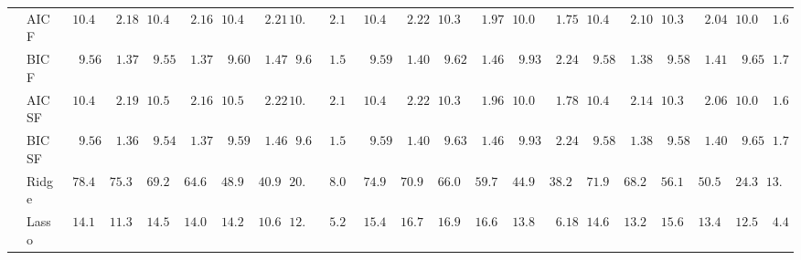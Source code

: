 \begin{tabular}{ll|ll|llllll|llllll|llllll}
 & AIC F  & $\phantom{0}10.48$ & $\phantom{00}2.18$ & $\phantom{0}10.49$ & $\phantom{00}2.16$ & $\phantom{0}10.49$ & $\phantom{00}2.21$ & $10.48$ & $\phantom{0}2.17$ & $\phantom{0}10.47$ & $\phantom{00}2.22$ & $\phantom{0}10.34$ & $\phantom{00}1.97$ & $\phantom{0}10.03$ & $\phantom{00}1.75$ & $\phantom{0}10.44$ & $\phantom{00}2.10$ & $\phantom{0}10.37$ & $\phantom{00}2.04$ & $\phantom{0}10.00$ & $\phantom{0}1.66$ \\
 & BIC F  & $\phantom{00}9.56$ & $\phantom{00}1.37$ & $\phantom{00}9.55$ & $\phantom{00}1.37$ & $\phantom{00}9.60$ & $\phantom{00}1.47$ & $\phantom{0}9.66$ & $\phantom{0}1.54$ & $\phantom{00}9.59$ & $\phantom{00}1.40$ & $\phantom{00}9.62$ & $\phantom{00}1.46$ & $\phantom{00}9.93$ & $\phantom{00}2.24$ & $\phantom{00}9.58$ & $\phantom{00}1.38$ & $\phantom{00}9.58$ & $\phantom{00}1.41$ & $\phantom{00}9.65$ & $\phantom{0}1.71$ \\
 & AIC SF  & $\phantom{0}10.49$ & $\phantom{00}2.19$ & $\phantom{0}10.50$ & $\phantom{00}2.16$ & $\phantom{0}10.50$ & $\phantom{00}2.22$ & $10.49$ & $\phantom{0}2.18$ & $\phantom{0}10.48$ & $\phantom{00}2.22$ & $\phantom{0}10.34$ & $\phantom{00}1.96$ & $\phantom{0}10.03$ & $\phantom{00}1.78$ & $\phantom{0}10.45$ & $\phantom{00}2.14$ & $\phantom{0}10.39$ & $\phantom{00}2.06$ & $\phantom{0}10.00$ & $\phantom{0}1.65$ \\
 & BIC SF  & $\phantom{00}9.56$ & $\phantom{00}1.36$ & $\phantom{00}9.54$ & $\phantom{00}1.37$ & $\phantom{00}9.59$ & $\phantom{00}1.46$ & $\phantom{0}9.66$ & $\phantom{0}1.54$ & $\phantom{00}9.59$ & $\phantom{00}1.40$ & $\phantom{00}9.63$ & $\phantom{00}1.46$ & $\phantom{00}9.93$ & $\phantom{00}2.24$ & $\phantom{00}9.58$ & $\phantom{00}1.38$ & $\phantom{00}9.58$ & $\phantom{00}1.40$ & $\phantom{00}9.65$ & $\phantom{0}1.71$ \\
 & Ridge  & $\phantom{0}78.43$ & $\phantom{0}75.30$ & $\phantom{0}69.23$ & $\phantom{0}64.62$ & $\phantom{0}48.98$ & $\phantom{0}40.90$ & $20.64$ & $\phantom{0}8.04$ & $\phantom{0}74.98$ & $\phantom{0}70.95$ & $\phantom{0}66.05$ & $\phantom{0}59.78$ & $\phantom{0}44.97$ & $\phantom{0}38.20$ & $\phantom{0}71.97$ & $\phantom{0}68.27$ & $\phantom{0}56.11$ & $\phantom{0}50.54$ & $\phantom{0}24.33$ & $13.60$ \\
 & Lasso  & $\phantom{0}14.13$ & $\phantom{0}11.34$ & $\phantom{0}14.59$ & $\phantom{0}14.06$ & $\phantom{0}14.26$ & $\phantom{0}10.61$ & $12.59$ & $\phantom{0}5.22$ & $\phantom{0}15.44$ & $\phantom{0}16.77$ & $\phantom{0}16.98$ & $\phantom{0}16.62$ & $\phantom{0}13.84$ & $\phantom{00}6.18$ & $\phantom{0}14.68$ & $\phantom{0}13.23$ & $\phantom{0}15.65$ & $\phantom{0}13.43$ & $\phantom{0}12.52$ & $\phantom{0}4.42$ \\

\end{tabular}
